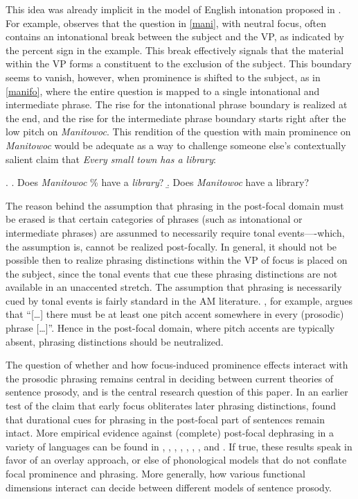 \documentclass[preprint,review,12pt,authoryear,times]{elsarticle}
\begin{document}
This idea was already implicit in the model of English intonation proposed in \citet{pierr80}. For example, \citet[265]{pierr80} observes that the question in \ref{mani}, with neutral focus, often contains an intonational break between the subject and the VP, as indicated by the percent sign in the example. This break effectively signals that the material within the VP forms a constituent to the exclusion of the subject. This boundary seems to vanish, however, when prominence is shifted to the subject, as in \ref{manifo}, where the entire question is mapped to a single intonational and intermediate phrase. The rise for the intonational phrase boundary is realized at the end, and the rise for the intermediate phrase boundary starts right after the low pitch on {\em Manitowoc}. This rendition of the question with main prominence on {\em Manitowoc} would be adequate as a way to challenge someone else's contextually salient claim that {\em Every small town has a library}: 

\ex. 
\a. Does {\em Manitowoc} \% have a {\em library}?\label{mani}
\b. Does {\em Manitowoc}  have a library?\label{manifo}

The reason behind the assumption that phrasing in the post-focal domain must be erased is that certain categories of phrases (such as intonational or intermediate phrases) are assunmed to necessarily require tonal events----which, the assumption is, cannot be realized post-focally. In general, it should not be possible then to realize phrasing distinctions within the VP of focus is placed on the subject, since the tonal events that cue these phrasing distinctions are not available in an unaccented stretch. The assumption that phrasing is necessarily cued by tonal events is fairly standard in the AM literature. \citet{beckm96}, for example,  argues that ``[\ldots] there must be at least one pitch accent somewhere in every (prosodic) phrase [\ldots]''. Hence in the post-focal domain, where pitch accents are typically absent, phrasing distinctions should be neutralized. 

The question of whether and how focus-induced prominence effects interact with the prosodic phrasing remains central in deciding between current theories of sentence prosody, and is the central research question of this paper. In an earlier test of the claim that early focus obliterates later phrasing distinctions,  \citet{norcl05} found that durational cues for phrasing in the post-focal part of sentences remain intact.  More empirical evidence against (complete) post-focal dephrasing in a variety of languages can be found in \citet{hayes91}, \citet{jun00}, \citet{sugah03}, \citet{ishih03}, \citet{ishih07}, \citet{fery10}, \citet{jun11}, \citet{ishih16} and \citet{kugle17}.  If true, these results speak in favor of an overlay approach, or else of phonological models that do not conflate focal prominence and phrasing. More generally, how various functional dimensions interact can decide between different models of sentence prosody. 
\end{document}
